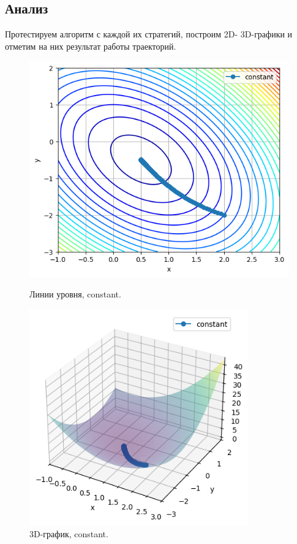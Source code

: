 \documentclass[a4paper,12pt]{article}
\begin{document}
\subsection{Анализ}
Протестируем алгоритм с каждой их стратегий, построим 2D- 3D-графики и отметим на них результат работы траекторий. 
\begin{figure}[H]
    \begin{minipage}{0.49\textwidth}
        \centering \includegraphics[width=\textwidth]{images/task2/plot_levels_2_2_constant.png} 
        \caption{Линии уровня, constant.}
    \end{minipage}\hfill
    \begin{minipage}{0.49\textwidth}
        \centering \includegraphics[width=0.84\textwidth]{images/task2/plot_3d_2_2_constant.png}
        \caption{3D-график, constant.}
    \end{minipage}
\end{figure}
\end{document}
